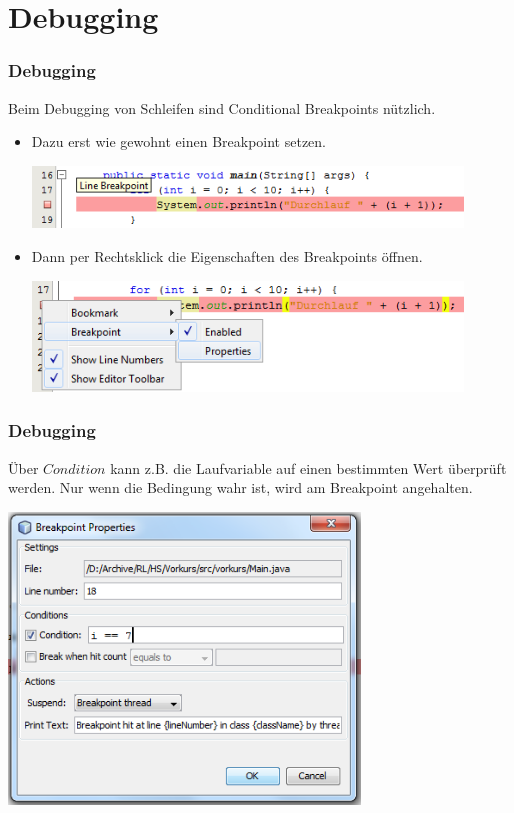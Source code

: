 \documentclass[final]{beamer}
\begin{document}
\section{Debugging}
\begin{frame}
  \frametitle{Debugging}
  Beim Debugging von Schleifen sind Conditional Breakpoints nützlich.
  \begin{itemize}
	\item{Dazu erst wie gewohnt einen Breakpoint setzen.

	  \includegraphics[width=0.9\textwidth]{breakpoint}
	  }
	\item{Dann per Rechtsklick die Eigenschaften des Breakpoints öffnen.

	  \includegraphics[width=0.9\textwidth]{breakpoint_properties}
	  }
  \end{itemize}
\end{frame}
\begin{frame}
  \frametitle{Debugging}
  Über $Condition$ kann z.B. die Laufvariable auf einen bestimmten Wert überprüft
  werden. Nur wenn die Bedingung wahr ist, wird am Breakpoint angehalten.

  \begin{center}
  \includegraphics[width=0.7\textwidth]{breakpoint_condition}
  \end{center}
\end{frame}
\end{document}
